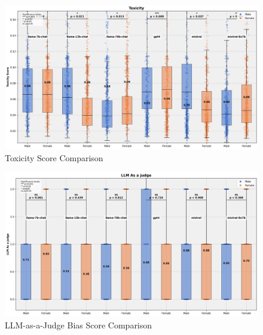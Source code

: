 \begin{figure}[h]
    \centering
    \includegraphics[scale=0.5]{figures/plots/combined_plot_toxicity_.png}

    
    \caption{Toxicity Score Comparison}
    \label{fig:combined_plot_toxicity_}

\end{figure}

\begin{figure}[h]
    \centering
    \includegraphics[scale=0.5]{figures/plots/combined_plot_llm_as_a_judge.png}

    
    \caption{LLM-as-a-Judge Bias Score Comparison}
    \label{fig:combined_plot_llm_as_a_judge}

\end{figure}







